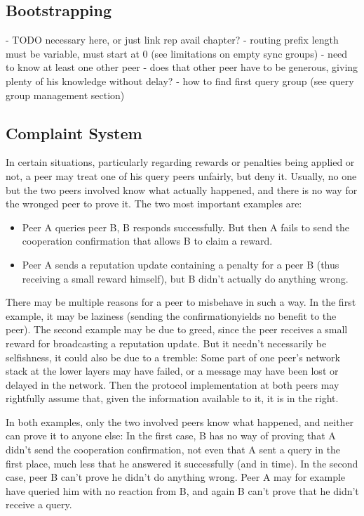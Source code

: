 \subsection{Bootstrapping}
\label{sec:desc_bootstrapping}
- TODO necessary here, or just link rep avail chapter?
- routing prefix length must be variable, must start at 0 (see limitations on
  empty sync groups)
- need to know at least one other peer
- does that other peer have to be generous, giving plenty of his knowledge
  without delay?
- how to find first query group (see query group management section)

\subsection{Complaint System}
\label{sec:desc_complaints}
In certain situations, particularly regarding rewards or penalties being applied
or not, a peer may treat one of his query peers unfairly, but deny it. Usually,
no one but the two peers involved know what actually happened, and there is no
way for the wronged peer to prove it. The two most important examples are:
\begin{itemize}
\item Peer A queries peer B, B responds successfully. But then A fails to send
      the cooperation confirmation that allows B to claim a reward.
\item Peer A sends a reputation update containing a penalty for a peer B (thus
      receiving a small reward himself), but B didn't actually do anything
      wrong.
\end{itemize}

There may be multiple reasons for a peer to misbehave in such a way. In the
first example, it may be laziness (sending the confirmationyields no benefit to
the peer). The second example may be due to greed, since the peer receives a
small reward for broadcasting a reputation update. But it needn't necessarily be
selfishness, it could also be due to a tremble: Some part of one peer's network
stack at the lower layers may have failed, or a message may have been lost or
delayed in the network. Then the protocol implementation at both peers may
rightfully assume that, given the information available to it, it is in the
right.

In both examples, only the two involved peers know what happened, and neither
can prove it to anyone else: In the first case, B has no way of proving that A
didn't send the cooperation confirmation, not even that A sent a query in the
first place, much less that he answered it successfully (and in time). In the
second case, peer B can't prove he didn't do anything wrong. Peer A may for
example have queried him with no reaction from B, and again B can't prove that
he didn't receive a query.

